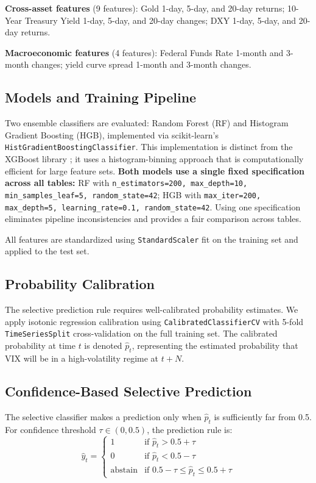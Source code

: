 \documentclass[12pt]{article}
\begin{document}
\textbf{Cross-asset features} (9 features): Gold 1-day, 5-day, and 20-day returns; 10-Year Treasury Yield 1-day, 5-day, and 20-day changes; DXY 1-day, 5-day, and 20-day returns.

\textbf{Macroeconomic features} (4 features): Federal Funds Rate 1-month and 3-month changes; yield curve spread 1-month and 3-month changes.

\subsection{Models and Training Pipeline}

Two ensemble classifiers are evaluated: Random Forest (RF) and Histogram Gradient Boosting (HGB), implemented via scikit-learn's \texttt{HistGradientBoostingClassifier}. This implementation is distinct from the XGBoost library \citep{chen2016}; it uses a histogram-binning approach that is computationally efficient for large feature sets. \textbf{Both models use a single fixed specification across all tables:} RF with \texttt{n\_estimators=200, max\_depth=10, min\_samples\_leaf=5, random\_state=42}; HGB with \texttt{max\_iter=200, max\_depth=5, learning\_rate=0.1, random\_state=42}. Using one specification eliminates pipeline inconsistencies and provides a fair comparison across tables.

All features are standardized using \texttt{StandardScaler} fit on the training set and applied to the test set.

\subsection{Probability Calibration}

The selective prediction rule requires well-calibrated probability estimates. We apply isotonic regression calibration using \texttt{CalibratedClassifierCV} with 5-fold \texttt{TimeSeriesSplit} cross-validation on the full training set. The calibrated probability at time $t$ is denoted $\hat{p}_t$, representing the estimated probability that VIX will be in a high-volatility regime at $t + N$.

\subsection{Confidence-Based Selective Prediction}

The selective classifier makes a prediction only when $\hat{p}_t$ is sufficiently far from 0.5. For confidence threshold $\tau \in (0, 0.5)$, the prediction rule is:
\begin{equation}
    \hat{y}_t = \begin{cases}
        1 & \text{if } \hat{p}_t > 0.5 + \tau \\
        0 & \text{if } \hat{p}_t < 0.5 - \tau \\
        \text{abstain} & \text{if } 0.5 - \tau \leq \hat{p}_t \leq 0.5 + \tau
    \end{cases}
    \label{eq:selective}
\end{equation}
\end{document}

